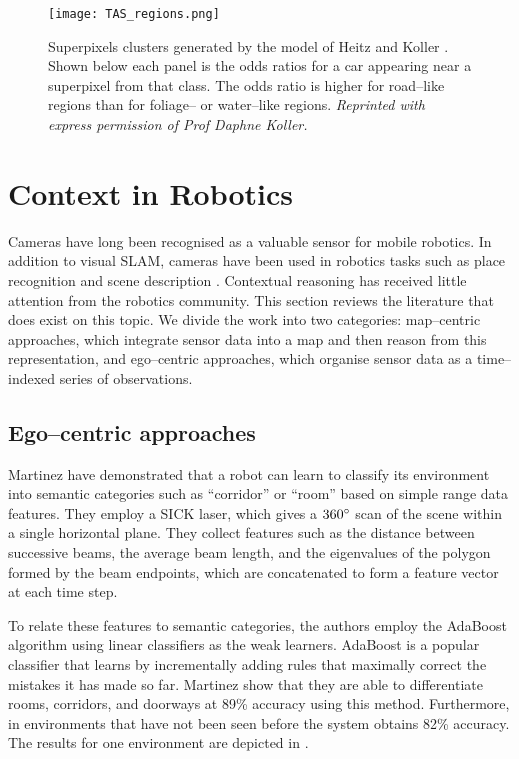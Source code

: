 \begin{figure}[tb]
  \centering
  \texttt{[image: TAS\_regions.png]}
  \caption{Superpixels clusters generated by the model of Heitz and
    Koller \cite{Heitz08}. Shown below each panel is the odds ratios for
    a car appearing near a superpixel from that class. The odds ratio is
    higher for road--like regions than for foliage-- or water--like
    regions.
    \textit{Reprinted with express permission of Prof Daphne Koller.}
    }
  \label{fig:TAS-regions}
\end{figure}

\section{Context in Robotics}
Cameras have long been recognised as a valuable sensor for mobile
robotics. In addition to visual SLAM, cameras have been used in
robotics tasks such as place recognition \cite{Cummins08} and scene
description \cite{Posner08}. Contextual reasoning has received little
attention from the robotics community. This section reviews the
literature that does exist on this topic. We divide the work into two
categories: map--centric approaches, which integrate sensor data into
a map and then reason from this representation, and ego--centric
approaches, which organise sensor data as a time--indexed series of
observations.

\subsection{Ego--centric approaches}
Martinez \etal \cite{Mozos05} have demonstrated that a robot can learn
to classify its environment into semantic categories such as
``corridor'' or ``room'' based on simple range data features. They
employ a SICK laser, which gives a $360\degrees$ scan of the scene
within a single horizontal plane. They collect features such as the
distance between successive beams, the average beam length, and the
eigenvalues of the polygon formed by the beam endpoints, which are
concatenated to form a feature vector at each time step.

To relate these features to semantic categories, the authors employ
the AdaBoost algorithm \cite{Schapire98} using linear classifiers as
the weak learners. AdaBoost is a popular classifier that learns by
incrementally adding rules that maximally correct the mistakes it has
made so far. Martinez \etal show that they are able to differentiate
rooms, corridors, and doorways at 89\% accuracy using this
method. Furthermore, in environments that have not been seen before
the system obtains 82\% accuracy. The results for one environment are
depicted in .

